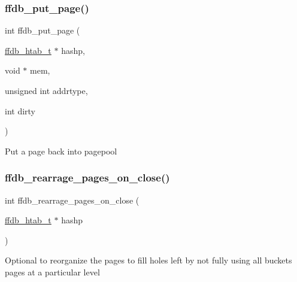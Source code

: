 \mbox{\label{adat-devel_2other__libs_2filedb_2filehash_2ffdb__page_8c_aee8d402020a44a72f40cff30ae2f9bd9}} 
\subsubsection{\texorpdfstring{ffdb\_put\_page()}{ffdb\_put\_page()}}
{\footnotesize\ttfamily int ffdb\+\_\+put\+\_\+page (\begin{DoxyParamCaption}\item[{\mbox{\hyperlink{adat-devel_2other__libs_2filedb_2filehash_2ffdb__hash_8h_ae592010ed2bedc975d3cc0b7d074b9d1}{ffdb\+\_\+htab\+\_\+t}} $\ast$}]{hashp,  }\item[{void $\ast$}]{mem,  }\item[{unsigned int}]{addrtype,  }\item[{int}]{dirty }\end{DoxyParamCaption})}

Put a page back into pagepool \mbox{\label{adat-devel_2other__libs_2filedb_2filehash_2ffdb__page_8c_a4dd9a21b6c522b97b005a32d7149984c}} 
\subsubsection{\texorpdfstring{ffdb\_rearrage\_pages\_on\_close()}{ffdb\_rearrage\_pages\_on\_close()}}
{\footnotesize\ttfamily int ffdb\+\_\+rearrage\+\_\+pages\+\_\+on\+\_\+close (\begin{DoxyParamCaption}\item[{\mbox{\hyperlink{adat-devel_2other__libs_2filedb_2filehash_2ffdb__hash_8h_ae592010ed2bedc975d3cc0b7d074b9d1}{ffdb\+\_\+htab\+\_\+t}} $\ast$}]{hashp }\end{DoxyParamCaption})}

Optional to reorganize the pages to fill holes left by not fully using all buckets pages at a particular level \mbox{\label{adat-devel_2other__libs_2filedb_2filehash_2ffdb__page_8c_a74b695499c18e8c1739c945a84cb675a}} 
